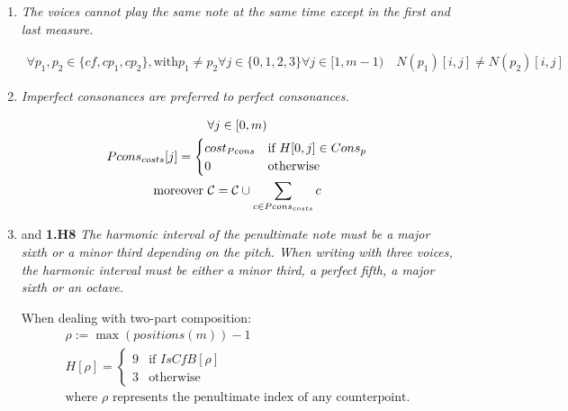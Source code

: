 \begin{enumerate}[wide, label=\bfseries 1.H\arabic*]
\item\label{rule:no-unison-appendix}{\textit{The voices cannot play the same note at the same time except in the first and last measure.}}

\begin{equation}
    \begin{gathered}
        \forall p_1, p_2 \in \{cf, cp_1, cp_2\}, \text{with} p_1 \neq p_2 \forall j \in \{0, 1, 2, 3\} \forall j \in [1, m-1) \quad
        N(p_1)[i, j] \neq N(p_2)[i, j]
    \end{gathered}
\end{equation}

\item \label{rule:prefer-imp-to-perf-appendix}{\textit{Imperfect consonances are preferred to perfect consonances.}}


\begin{equation}
    \begin{gathered}
        \forall j \in [0, m)\\
        Pcons_{costs}[j] = \begin{cases}
            cost_{Pcons} & \text{if } H[0, j] \in Cons_{p}\\
            0 & \text{otherwise}
        \end{cases}\\
        \text{moreover } \mathcal{C} = \mathcal{C} \cup \sum _{c \in Pcons_{costs}} c
    \end{gathered}
\end{equation}

\item{and \textbf{1.H8} \textit{The harmonic interval of the penultimate note must be a major sixth or a minor third depending on the \cfs pitch. When writing with three voices, the harmonic interval must be either a minor third, a perfect fifth, a major sixth or an octave.}}\label{rule:penult-interval-2v}
\addtocounter{enumi}{1} 
When dealing with two-part composition:
\begin{equation}
    \begin{gathered}
        \rho := \max (positions(m)) - 1\\
        H[\rho] = \begin{cases}
            9 & \text{if } \mathit{IsCfB}[\rho]\\
            3 & \text{otherwise}
        \end{cases}\\
        \text{where } \rho \text{ represents the penultimate index of any counterpoint.}
    \end{gathered}
\end{equation}


\end{enumerate}
